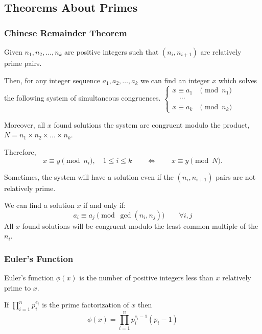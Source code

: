 \documentclass[10pt,a4paper,titlepage,twoside,draft]{article}
\theoremstyle{plain}
\theoremstyle{definition}
\theoremstyle{remark}
\begin{document}
\subsection{Theorems About Primes}


\subsubsection{Chinese Remainder Theorem}


Given $n_{1},n_{2}, \ldots, n_{k}$ are positive integers such that $(n_{i},n_{i+1})$ are relatively prime pairs. 

Then, for any integer sequence $a_{1},a_{2}, \ldots, a_{k}$ we can find an integer $x$ which solves the following system of simultaneous congruences.
$ {\begin{cases}x\equiv a_{1}&{\pmod {n_{1}}}\\\quad \cdots \\x\equiv a_{k}&{\pmod {n_{k}}}\end{cases}} $

\smallskip

Moreover, all $x$ found solutions the system are congruent modulo the product, $N = n_{1} \times n_{2} \times \ldots \times n_{k}$. 

\smallskip

Therefore, 
\[x\equiv y{\pmod {n_{i}}},\quad 1\leq i\leq k\qquad \Longleftrightarrow \qquad x\equiv y{\pmod {N}}. \]

\medskip

Sometimes, the system will have a solution even if the $(n_{i},n_{i+1})$ pairs are not relatively prime. 

We can find a solution $x$ if and only if:
\[ a_{i}\equiv a_{j}{\pmod {\gcd(n_{i},n_{j})}}\qquad \forall i,j \]
All $x$ found solutions will be congruent modulo the least common multiple of the $n_{i}$.



\subsubsection{Euler's Function}

Euler's function $\phi(x)$ is the number of positive integers less than $x$ relatively prime to $x$.

\smallskip

If $\prod_{i=1}^n p^{e_{i}}_{i}$ is the prime factorization of $x$ then
\[\phi(x) = \prod_{i=1}^{n} p^{e_{i} - 1}_{i} (p_{i} - 1)\]
\end{document}
